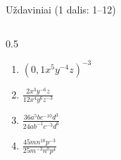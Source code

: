 \documentclass[aspectratio=169,10pt]{beamer}
\begin{document}
\begin{frame}{Uždaviniai (1 dalis: 1--12)}
\begin{columns}[T]
\begin{column}{0.5\textwidth}
\begin{enumerate}
                \item
                $\left(
                0{,}1x^5y^{-4}z
                \right)^{-3}$

                \item
                $\frac{
                2x^3y^{-6}z
                }{
                12x^4y^6z^{-3}
                }$

                \item
                $\frac{
                36a^5bc^{-10}d^3
                }{
                24ab^{-1}c^{-3}d^6
                }$

                \item
                $\frac{
                45mn^{10}p^{-3}
                }{
                25m^{-3}n^0p^4
                }$

            \end{enumerate}

        \end{column}

    \end{columns}

\end{frame}

\end{document}
